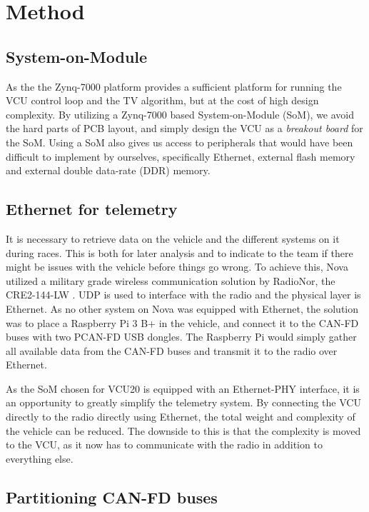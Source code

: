 \section{Method}

\subsection{System-on-Module}

As the the Zynq-7000 platform provides a sufficient platform for running the VCU control loop and the TV algorithm, but at the cost of high design complexity. By utilizing a Zynq-7000 based System-on-Module (SoM), we avoid the hard parts of PCB layout, and simply design the VCU as a \emph{breakout board} for the SoM. Using a SoM also gives us access to peripherals that would have been difficult to implement by ourselves, specifically Ethernet, external flash memory and external double data-rate (DDR) memory.


\subsection{Ethernet for telemetry}

It is necessary to retrieve data on the vehicle and the different systems on it during races. This is both for later analysis and to indicate to the team if there might be issues with the vehicle before things go wrong. To achieve this, Nova utilized a military grade wireless communication solution by RadioNor, the CRE2-144-LW \cite{radionor}. UDP is used to interface with the radio and the physical layer is Ethernet. As no other system on Nova was equipped with Ethernet, the solution was to place a Raspberry Pi 3 B+ in the vehicle, and connect it to the CAN-FD buses with two PCAN-FD USB dongles. The Raspberry Pi would simply gather all available data from the CAN-FD buses and transmit it to the radio over Ethernet. 

As the SoM chosen for VCU20 is equipped with an Ethernet-PHY interface, it is an opportunity to greatly simplify the telemetry system. By connecting the VCU directly to the radio directly using Ethernet, the total weight and complexity of the vehicle can be reduced. The downside to this is that the complexity is moved to the VCU, as it now has to communicate with the radio in addition to everything else.


\subsection{Partitioning CAN-FD buses}

